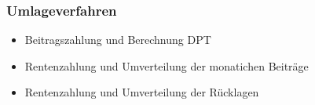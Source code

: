 \subsubsection{Umlageverfahren}

\begin{itemize}
\item Beitragszahlung und Berechnung DPT
\item Rentenzahlung und Umverteilung der monatichen Beiträge
\item Rentenzahlung und Umverteilung der Rücklagen
\end{itemize}